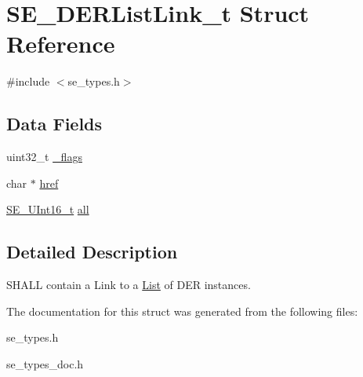 \hypertarget{structSE__DERListLink__t}{}\section{S\+E\+\_\+\+D\+E\+R\+List\+Link\+\_\+t Struct Reference}
\label{structSE__DERListLink__t}


{\ttfamily \#include $<$se\+\_\+types.\+h$>$}

\subsection*{Data Fields}
\begin{DoxyCompactItemize}
\item 
uint32\+\_\+t \hyperlink{group__DERListLink_gaee6ce628f2091dcf88d52810ed657455}{\+\_\+flags}
\item 
char $\ast$ \hyperlink{group__DERListLink_ga4df96d560e9da39b6341abac4a6edee6}{href}
\item 
\hyperlink{group__UInt16_gac68d541f189538bfd30cfaa712d20d29}{S\+E\+\_\+\+U\+Int16\+\_\+t} \hyperlink{group__DERListLink_ga174e67e5b734894a91aa477c422cc07c}{all}
\end{DoxyCompactItemize}


\subsection{Detailed Description}
S\+H\+A\+LL contain a Link to a \hyperlink{structList}{List} of D\+ER instances. 

The documentation for this struct was generated from the following files\+:\begin{DoxyCompactItemize}
\item 
se\+\_\+types.\+h\item 
se\+\_\+types\+\_\+doc.\+h\end{DoxyCompactItemize}
